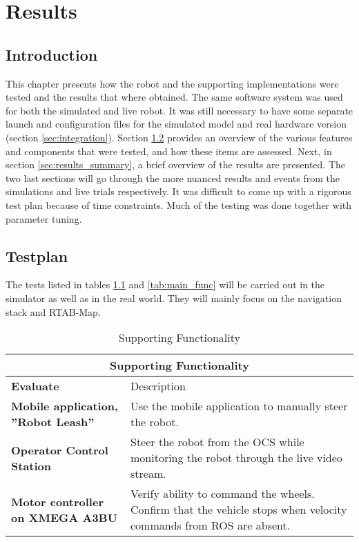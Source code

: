 \chapter{Results}
\label{chp:results} 

\section{Introduction}

This chapter presents how the robot and the supporting implementations were tested and the results that where obtained. The same software system was used for both the simulated and live robot. It was still necessary to have some separate launch and configuration files for the simulated model and real hardware version (section \ref{sec:integration}). Section \ref{sec:testplan} provides an overview of the various features and components that were tested, and how these items are assessed. Next, in section \ref{sec:results_summary}, a brief overview of the results are presented. The two last sections will go through the more nuanced results and events from the simulations and live trials respectively. It was difficult to come up with a rigorous test plan because of time constraints. Much of the testing was done together with parameter tuning. 


\section{Testplan}
\label{sec:testplan}
The tests listed in tables \ref{tab:support_func} and \ref{tab:main_func} will be carried out in the simulator as well as in the real world. They will mainly focus on the navigation stack and \ac{RTAB-Map}. 

\begin{table}
	\centering
	\begin{tabular}{ p{3.5cm} | p{7cm} }
		\multicolumn{2}{c}{Supporting Functionality}\\
		\hline
		\textbf{Evaluate} & Description\\
		\hline\hline
		\textbf{Mobile application, ''Robot Leash''} & Use the mobile application to manually steer the robot.\\
		\hline
		\textbf{Operator Control Station} & Steer the robot from the \ac{OCS} while monitoring the robot through the live video stream. \\
		\hline
		\textbf{Motor controller on XMEGA A3BU} & Verify ability to command the wheels. Confirm that the vehicle stops when velocity commands from \ac{ROS} are absent.\\
		\hline
	\end{tabular}
	\caption{Supporting Functionality}\label{tab:support_func}
\end{table}

